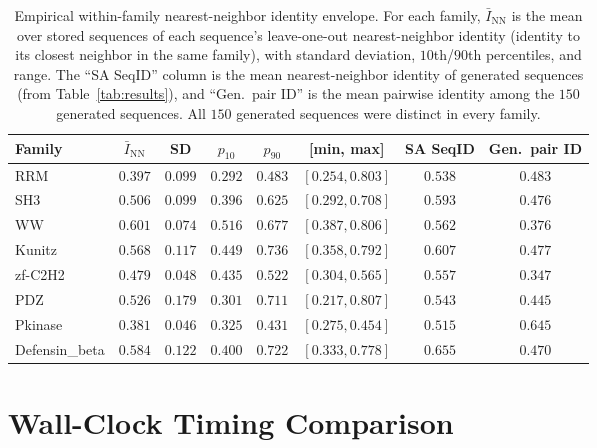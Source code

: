 \begin{table}[ht]
\centering
\caption{Empirical within-family nearest-neighbor identity envelope. For each family, $\bar{I}_{\mathrm{NN}}$ is the mean over stored sequences of each sequence's leave-one-out nearest-neighbor identity (identity to its closest neighbor in the same family), with standard deviation, $10$th/$90$th percentiles, and range. The ``SA SeqID'' column is the mean nearest-neighbor identity of generated sequences (from Table~\ref{tab:results}), and ``Gen.\ pair ID'' is the mean pairwise identity among the $150$ generated sequences. All $150$ generated sequences were distinct in every family.}
\label{tab:nn-band}
\small
\begin{tabular}{@{}lccccccc@{}}
\toprule
Family & $\bar{I}_{\mathrm{NN}}$ & SD & $p_{10}$ & $p_{90}$ & [min, max] & SA SeqID & Gen.\ pair ID \\
\midrule
RRM            & $0.397$ & $0.099$ & $0.292$ & $0.483$ & $[0.254, 0.803]$ & $0.538$ & $0.483$ \\
SH3            & $0.506$ & $0.099$ & $0.396$ & $0.625$ & $[0.292, 0.708]$ & $0.593$ & $0.476$ \\
WW             & $0.601$ & $0.074$ & $0.516$ & $0.677$ & $[0.387, 0.806]$ & $0.562$ & $0.376$ \\
Kunitz         & $0.568$ & $0.117$ & $0.449$ & $0.736$ & $[0.358, 0.792]$ & $0.607$ & $0.477$ \\
zf-C2H2        & $0.479$ & $0.048$ & $0.435$ & $0.522$ & $[0.304, 0.565]$ & $0.557$ & $0.347$ \\
PDZ            & $0.526$ & $0.179$ & $0.301$ & $0.711$ & $[0.217, 0.807]$ & $0.543$ & $0.445$ \\
Pkinase        & $0.381$ & $0.046$ & $0.325$ & $0.431$ & $[0.275, 0.454]$ & $0.515$ & $0.645$ \\
Defensin\_beta & $0.584$ & $0.122$ & $0.400$ & $0.722$ & $[0.333, 0.778]$ & $0.655$ & $0.470$ \\
\bottomrule
\end{tabular}
\end{table}

\section{Wall-Clock Timing Comparison}\label{si:timing}

